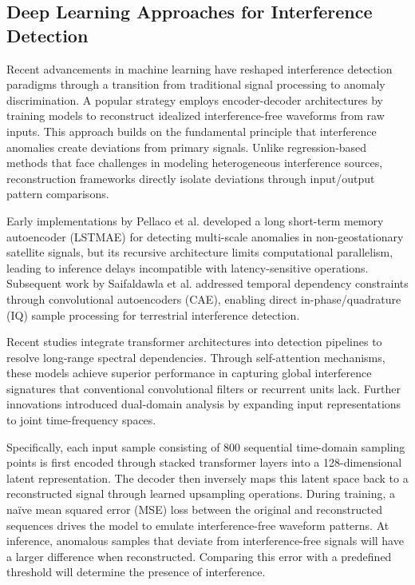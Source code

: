 \documentclass[conference]{IEEEtran}
\begin{document}
\subsection{Deep Learning Approaches for Interference Detection}
\label{ssec:related_works}

Recent advancements in machine learning have reshaped interference detection paradigms through a transition from traditional signal processing to anomaly discrimination. A popular strategy employs encoder-decoder architectures by training models to reconstruct idealized interference-free waveforms from raw inputs. This approach builds on the fundamental principle that interference anomalies create deviations from primary signals. Unlike regression-based methods that face challenges in modeling heterogeneous interference sources, reconstruction frameworks directly isolate deviations through input/output pattern comparisons.

Early implementations by Pellaco et al. \cite{pellacoSpectrumPredictionInterference2019} developed a long short-term memory autoencoder (LSTMAE) for detecting multi-scale anomalies in non-geostationary satellite signals, but its recursive architecture limits computational parallelism, leading to inference delays incompatible with latency-sensitive operations. Subsequent work by Saifaldawla et al. \cite{saifaldawlaConvolutionalAutoencodersNonGeostationary2024} addressed temporal dependency constraints through convolutional autoencoders (CAE), enabling direct in-phase/quadrature (IQ) sample processing for terrestrial interference detection.

Recent studies \cite{saifaldawlaGenAIBasedModelsNGSO2024} integrate transformer architectures into detection pipelines to resolve long-range spectral dependencies. Through self-attention mechanisms, these models achieve superior performance in capturing global interference signatures that conventional convolutional filters or recurrent units lack. Further innovations introduced dual-domain analysis by expanding input representations to joint time-frequency spaces.

Specifically, each input sample consisting of 800 sequential time-domain sampling points is first encoded through stacked transformer layers into a 128-dimensional latent representation. The decoder then inversely maps this latent space back to a reconstructed signal through learned upsampling operations. During training, a naïve mean squared error (MSE) loss between the original and reconstructed sequences drives the model to emulate interference-free waveform patterns. At inference, anomalous samples that deviate from interference-free signals will have a larger difference when reconstructed. Comparing this error with a predefined threshold will determine the presence of interference.
\end{document}
